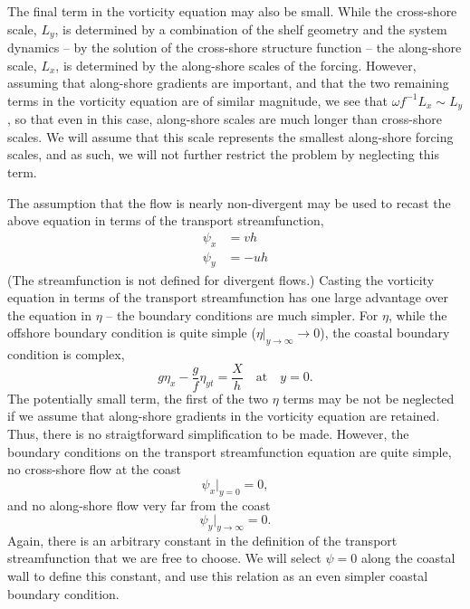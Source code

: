 \documentclass[11pt]{report}
\numberwithin{equation}{section}
\begin{document}
The final term in the vorticity equation may also be small.  While the cross-shore scale, $L_y$, is determined by a combination of the shelf geometry and the system dynamics -- by the solution of the cross-shore structure function -- the along-shore scale, $L_x$, is determined by the along-shore scales of the forcing.  However, assuming that along-shore gradients are important, and that the two remaining terms in the vorticity equation are of similar magnitude, we see that $\omega f^{-1} L_x \sim L_y$, so that even in this case, along-shore scales are much longer than cross-shore scales.  We will assume that this scale represents the smallest along-shore forcing scales, and as such, we will not further restrict the problem by neglecting this term.

The assumption that the flow is nearly non-divergent may be used to recast the above equation in terms of the transport streamfunction,
\begin{align}
        \psi_x &= v h \\
        \psi_y &= -u h
\end{align}
(The streamfunction is not defined for divergent flows.)  Casting the vorticity equation in terms of the transport streamfunction has one large advantage over the equation in $\eta$ -- the boundary conditions are much simpler.  For $\eta$, while the offshore boundary condition is quite simple ($\eta|_{y\rightarrow\infty} \rightarrow 0$), the coastal boundary condition is complex,
\begin{equation}
    g \eta_x - \frac{g}{f}\eta_{y t} = \frac{X}{h} \quad \mathrm{at} \quad y=0.
\end{equation}
The potentially small term, the first of the two $\eta$ terms may be not be neglected if we assume that along-shore gradients in the vorticity equation are retained.  Thus, there is no straigtforward simplification to be made.  However, the boundary conditions on the transport streamfunction equation are quite simple, no cross-shore flow at the coast
\begin{equation}
    \psi_x\bigg|_{y=0} = 0,
\end{equation}
and no along-shore flow very far from the coast
\begin{equation}
    \psi_y\bigg|_{y\rightarrow\infty} = 0.
\end{equation}
Again, there is an arbitrary constant in the definition of the transport streamfunction that we are free to choose.  We will select $\psi=0$ along the coastal wall to define this constant, and use this relation as an even simpler coastal boundary condition.  
\end{document}

